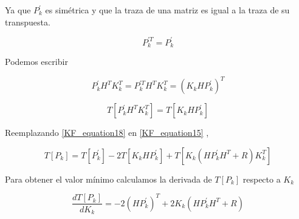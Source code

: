 \documentclass[10pt,a4paper]{article}
\begin{document}
Ya que $P^\prime_k$ es simétrica  y que la traza de una matriz es igual a la traza de su transpuesta.

\begin{figure}[h!]
	\begin{center}
		\begin{equation}
		P^{\prime T}_k  = P^\prime_k
		\label{KF_equation16}
		\end{equation}	
	\end{center}
\end{figure}

Podemos escribir

\begin{figure}[h!]
	\begin{center}
		\begin{equation}
		P^\prime_k H^T K^T_k = P^{\prime T}_k H^T K^T_k = (K_k H P^\prime_k )^T
		\label{KF_equation17}
		\end{equation}	
	\end{center}
\end{figure}

\begin{figure}[h!]
	\begin{center}
		\begin{equation}
		 T[P^\prime_k H^T K^T_k] = T[K_k H P^\prime_k]
		 \label{KF_equation18}
		\end{equation}	
	\end{center}
\end{figure}

Reemplazando \ref{KF_equation18} en \ref{KF_equation15} ,
\begin{figure}[h!]
	\begin{center}
		\begin{equation}
		T[P_k] = T[P^\prime_k] -2 T[K_k H P^\prime_k] + T[K_k (H P^\prime_k H^T + R) K^T_k]
		\label{KF_equation19}
		\end{equation}	
	\end{center}
\end{figure}

Para obtener el valor mínimo calculamos la derivada de $T[P_k]$ respecto a $K_k$

\begin{figure}[h!]
	\begin{center}
		\begin{equation}
		\frac{dT[P_k]}{dK_k} = -2 (H P^\prime_k)^T + 2K_k (H P^\prime_k H^T + R)
		\label{KF_equation20}
		\end{equation}	
	\end{center}
\end{figure}
\end{document}
